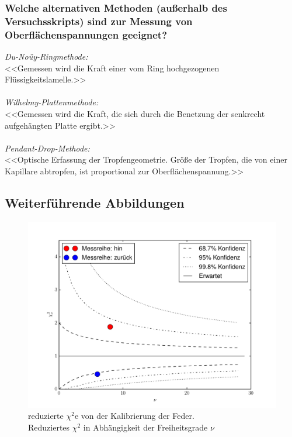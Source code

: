 	\subsubsection[Frage 3]{Welche alternativen Methoden (außerhalb des Versuchsskripts) sind zur Messung von Oberflächenspannungen geeignet?} \label{sect: Frage 3}
	\textit{Du-Noüy-Ringmethode:}\\
	<<Gemessen wird die Kraft  einer vom Ring hochgezogenen Flüssigkeitslamelle.>>\smartcite{Unbekannt.04.07.2021}\\
	\\
	\textit{Wilhelmy-Plattenmethode:}\\
	<<Gemessen wird die Kraft, die sich durch die Benetzung der senkrecht aufgehängten Platte ergibt.>>\smartcite{Unbekannt.04.07.2021}\\
	\\
	\textit{Pendant-Drop-Methode:}\\
	<<Optische Erfassung der Tropfengeometrie. Größe der Tropfen, die von einer Kapillare abtropfen, ist proportional zur Oberflächenspannung.>>\smartcite{Unbekannt.04.07.2021}
	
	
	
	\newpage
	\subsection{Weiterführende Abbildungen}
		\begin{figure}[ht!]
		\centering
		\includegraphics[width=450pt]{fotos/gpr1/M5_Chi_Quadrat.pdf}
		\caption[reduzierte Chi Quadrate]{reduzierte $  \chi^{2} $e von der Kalibrierung der Feder. \\Reduziertes $  \chi^{2} $ in Abhängigkeit der Freiheitsgrade $ \nu $}
		\label{Abb: Chi Quadrate}
	\end{figure}

